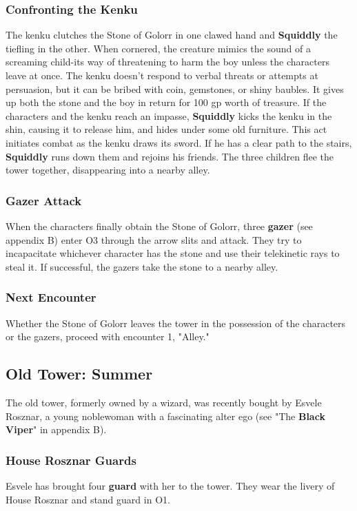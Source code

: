 \documentclass[10pt,a4paper,twoside,twocolumn,openany,nodeprecatedcode]{dndbook}
\begin{document}
\subsubsection{Confronting the Kenku}
The kenku clutches the Stone of Golorr in one clawed hand and \textbf{Squiddly} the tiefling in the other. When cornered, the creature mimics the sound of a screaming child-its way of threatening to harm the boy unless the characters leave at once. The kenku doesn't respond to verbal threats or attempts at persuasion, but it can be bribed with coin, gemstones, or shiny baubles. It gives up both the stone and the boy in return for 100 gp worth of treasure.
If the characters and the kenku reach an impasse, \textbf{Squiddly} kicks the kenku in the shin, causing it to release him, and hides under some old furniture. This act initiates combat as the kenku draws its sword.
If he has a clear path to the stairs, \textbf{Squiddly} runs down them and rejoins his friends. The three children flee the tower together, disappearing into a nearby alley.
\subsubsection{Gazer Attack}
When the characters finally obtain the Stone of Golorr, three \textbf{gazer} (see appendix B) enter O3 through the arrow slits and attack. They try to incapacitate whichever character has the stone and use their telekinetic rays to steal it. If successful, the gazers take the stone to a nearby alley.
\subsubsection{Next Encounter}
Whether the Stone of Golorr leaves the tower in the possession of the characters or the gazers, proceed with encounter 1, "Alley."
\subsection{Old Tower: Summer}
The old tower, formerly owned by a wizard, was recently bought by Esvele Rosznar, a young noblewoman with a fascinating alter ego (see "The \textbf{Black Viper}" in appendix B).
\subsubsection{House Rosznar Guards}
Esvele has brought four \textbf{guard} with her to the tower. They wear the livery of House Rosznar and stand guard in O1.
\end{document}
